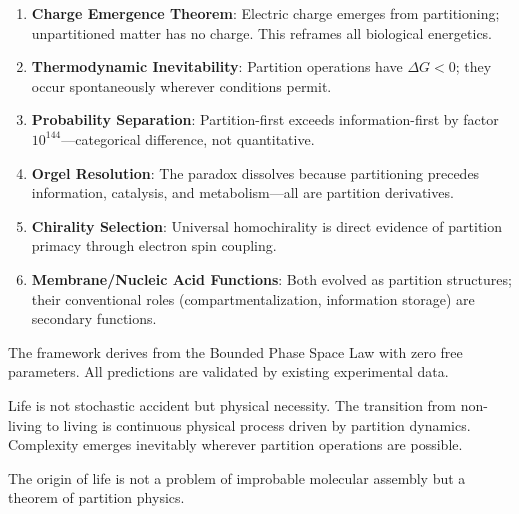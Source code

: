 \documentclass[twocolumn,10pt,a4paper]{article}
\theoremstyle{definition}
\theoremstyle{remark}
\begin{document}
\begin{enumerate}
    \item \textbf{Charge Emergence Theorem}: Electric charge emerges from partitioning; unpartitioned matter has no charge. This reframes all biological energetics.

    \item \textbf{Thermodynamic Inevitability}: Partition operations have $\Delta G < 0$; they occur spontaneously wherever conditions permit.

    \item \textbf{Probability Separation}: Partition-first exceeds information-first by factor $10^{144}$---categorical difference, not quantitative.

    \item \textbf{Orgel Resolution}: The paradox dissolves because partitioning precedes information, catalysis, and metabolism---all are partition derivatives.

    \item \textbf{Chirality Selection}: Universal homochirality is direct evidence of partition primacy through electron spin coupling.

    \item \textbf{Membrane/Nucleic Acid Functions}: Both evolved as partition structures; their conventional roles (compartmentalization, information storage) are secondary functions.
\end{enumerate}

The framework derives from the Bounded Phase Space Law with zero free parameters. All predictions are validated by existing experimental data.

Life is not stochastic accident but physical necessity. The transition from non-living to living is continuous physical process driven by partition dynamics. Complexity emerges inevitably wherever partition operations are possible.

The origin of life is not a problem of improbable molecular assembly but a theorem of partition physics.



\end{document}
